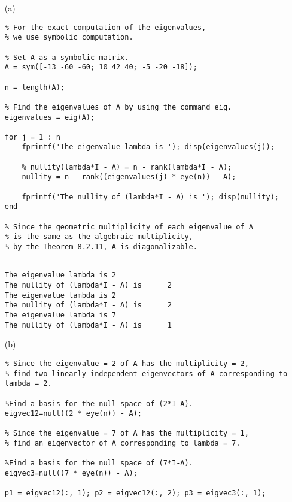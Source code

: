 \begin{sol}
\verb""
\begin{enumerate}
\item[(a)]
\begin{verbatim}
% For the exact computation of the eigenvalues, 
% we use symbolic computation. 

% Set A as a symbolic matrix.
A = sym([-13 -60 -60; 10 42 40; -5 -20 -18]); 

n = length(A);

% Find the eigenvalues of A by using the command eig.
eigenvalues = eig(A); 

for j = 1 : n
    fprintf('The eigenvalue lambda is '); disp(eigenvalues(j));
    
    % nullity(lambda*I - A) = n - rank(lambda*I - A);
    nullity = n - rank((eigenvalues(j) * eye(n)) - A);
    
    fprintf('The nullity of (lambda*I - A) is '); disp(nullity);
end

% Since the geometric multiplicity of each eigenvalue of A 
% is the same as the algebraic multiplicity,
% by the Theorem 8.2.11, A is diagonalizable.
\end{verbatim}

\begin{outputs}

\begin{verbatim}

The eigenvalue lambda is 2
The nullity of (lambda*I - A) is      2
The eigenvalue lambda is 2
The nullity of (lambda*I - A) is      2
The eigenvalue lambda is 7
The nullity of (lambda*I - A) is      1
\end{verbatim}

\end{outputs}


\item[(b)]
\begin{verbatim}
% Since the eigenvalue = 2 of A has the multiplicity = 2, 
% find two linearly independent eigenvectors of A corresponding to lambda = 2.

%Find a basis for the null space of (2*I-A).
eigvec12=null((2 * eye(n)) - A);

% Since the eigenvalue = 7 of A has the multiplicity = 1, 
% find an eigenvector of A corresponding to lambda = 7.

%Find a basis for the null space of (7*I-A).
eigvec3=null((7 * eye(n)) - A);

p1 = eigvec12(:, 1); p2 = eigvec12(:, 2); p3 = eigvec3(:, 1); 


\end{verbatim}
\end{enumerate}
\end{sol}
